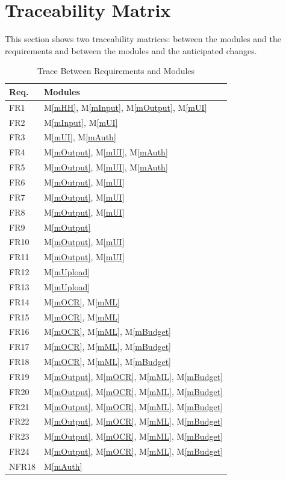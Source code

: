 \documentclass[12pt, titlepage]{article}
\newcommand{\mref}[1]{M\ref{#1}}
\begin{document}
\section{Traceability Matrix} \label{SecTM}

This section shows two traceability matrices: between the modules and the
requirements and between the modules and the anticipated changes.

\begin{table}[H]
\caption{Trace Between Requirements and Modules}
\centering
\begin{tabular}{p{} p{}}
\toprule
\textbf{Req.} & \textbf{Modules}\\
\midrule
FR1 & \mref{mHH}, \mref{mInput}, \mref{mOutput}, \mref{mUI}\\
FR2 & \mref{mInput}, \mref{mUI}\\
FR3 & \mref{mUI}, \mref{mAuth}\\
FR4 & \mref{mOutput}, \mref{mUI}, \mref{mAuth}\\
FR5 & \mref{mOutput}, \mref{mUI}, \mref{mAuth}\\
FR6 & \mref{mOutput}, \mref{mUI}\\
FR7 & \mref{mOutput}, \mref{mUI}\\
FR8 & \mref{mOutput}, \mref{mUI}\\
FR9 & \mref{mOutput}\\
FR10 & \mref{mOutput}, \mref{mUI}\\
FR11 & \mref{mOutput}, \mref{mUI}\\
FR12 & \mref{mUpload}\\
FR13 & \mref{mUpload}\\
FR14 & \mref{mOCR}, \mref{mML}\\
FR15 & \mref{mOCR}, \mref{mML}\\
FR16 & \mref{mOCR}, \mref{mML}, \mref{mBudget}\\
FR17 & \mref{mOCR}, \mref{mML}, \mref{mBudget}\\
FR18 & \mref{mOCR}, \mref{mML}, \mref{mBudget}\\
FR19 & \mref{mOutput}, \mref{mOCR}, \mref{mML}, \mref{mBudget}\\
FR20 & \mref{mOutput}, \mref{mOCR}, \mref{mML}, \mref{mBudget}\\
FR21 & \mref{mOutput}, \mref{mOCR}, \mref{mML}, \mref{mBudget}\\
FR22 & \mref{mOutput}, \mref{mOCR}, \mref{mML}, \mref{mBudget}\\
FR23 & \mref{mOutput}, \mref{mOCR}, \mref{mML}, \mref{mBudget}\\
FR24 & \mref{mOutput}, \mref{mOCR}, \mref{mML}, \mref{mBudget}\\
NFR18 & \mref{mAuth}\\

\bottomrule
\end{tabular}
\label{TblRT}
\end{table}
\end{document}
